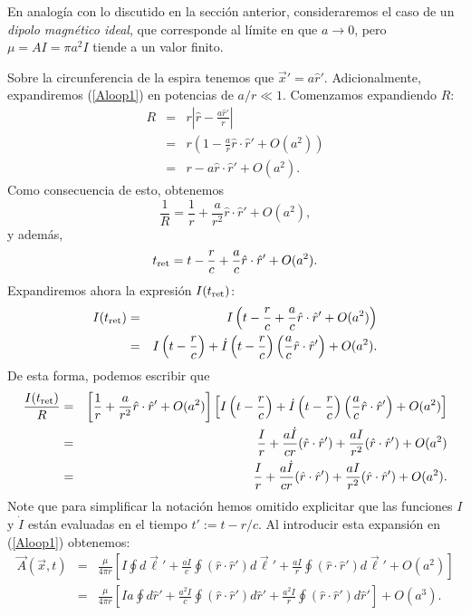 En analogía con lo discutido en la sección anterior, consideraremos el caso de un \textit{dipolo magnético ideal}, que corresponde al límite en que $a\to 0$, pero $\mu=AI=\pi a^2I$ tiende a un valor finito.

Sobre la circunferencia de la espira tenemos que $\vec{x}'=a\hat{r}'$. Adicionalmente, expandiremos (\ref{Aloop1}) en potencias de $a/r\ll 1$.  Comenzamos expandiendo $R$:
\begin{eqnarray}
 R&=&r\left|\hat{r}-\frac{a\hat{r}'}{r}\right| \\
&=&r\left(1-\frac{a}{r}\hat{r}\cdot\hat{r}'+O(a^2)\right) \\
&=& r-a\hat{r}\cdot\hat{r}'+O(a^2).
\end{eqnarray}
Como consecuencia de esto, obtenemos
\begin{equation}
 \frac{1}{R}=\frac{1}{r}+\frac{a}{r^2}\hat{r}\cdot\hat{r}'+O(a^2),
\end{equation}
y además,
\begin{equation}
 t_{\rm ret}=t-\frac{r}{c}+\frac{a}{c}\hat{r}\cdot\hat{r}'+O(a^2).
\end{equation}
Expandiremos ahora la expresión $I(t_{\rm ret})$:
\begin{eqnarray}
 I(t_{\rm ret})
&=&I\left(t-\frac{r}{c}+\frac{a}{c}\hat{r}\cdot\hat{r}'+O(a^2)\right) \\
&=&I\left(t-\frac{r}{c}\right)+\dot{I}\left(t-\frac{r}{c}\right)\left(\frac{a}{c}\hat{r}\cdot\hat{r}'\right)+O(a^2).
\end{eqnarray}
De esta forma, podemos escribir que
\begin{eqnarray}
\frac{I(t_{\rm ret})}{R}
&=&\left[\frac{1}{r}+\frac{a}{r^2}\hat{r}\cdot\hat{r}'+O(a^2)\right]\left[I\left(t-\frac{r}{c}\right)+\dot{I}\left(t-\frac{r}{c}\right)\left(\frac{a}{c}\hat{r}\cdot\hat{r}'\right)+O(a^2)\right]\\
&=&\frac{I}{r}+\frac{a\dot{I}}{cr}(\hat{r}\cdot\hat{r}')+\frac{aI}{r^2}(\hat{r}\cdot\hat{r}')
+O(a^2)\\
&=&\frac{I}{r}+\frac{a\dot{I}}{cr}(\hat{r}\cdot\hat{r}')+\frac{aI}{r^2}(\hat{r}\cdot\hat{r}')+O(a^2).
\end{eqnarray}
Note que para simplificar la notación hemos omitido explicitar que las funciones $I$ y $\dot{I}$ están evaluadas en el tiempo $t':=t-r/c$. Al introducir esta expansión en (\ref{Aloop1}) obtenemos:
\begin{eqnarray}
 \vec{A}(\vec{x},t)&=&\frac{\mu}{4\pi r}\left[I\oint d\vec{\ell}'
+\frac{a\dot{I}}{c}\oint(\hat{r}\cdot\hat{r}')d\vec{\ell}'+\frac{aI}{r}\oint(\hat{r}\cdot\hat{r}')d\vec{\ell}'+O(a^2)\right]  \\
&=&\frac{\mu}{4\pi r}\left[Ia\oint d\hat{r}'
+\frac{a^2\dot{I}}{c}\oint(\hat{r}\cdot\hat{r}')d\hat{r}'+\frac{a^2I}{r}\oint(\hat{r}\cdot\hat{r}')d\hat{r}'\right] +O(a^3).
\end{eqnarray}
